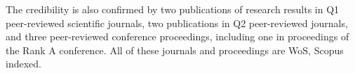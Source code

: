 The credibility is also confirmed by two publications of research results in Q1 peer-reviewed scientific journals, two publications in Q2 peer-reviewed journals, and three peer-reviewed conference proceedings, including one in proceedings of the Rank A conference. All of these journals and proceedings are WoS, Scopus indexed.











